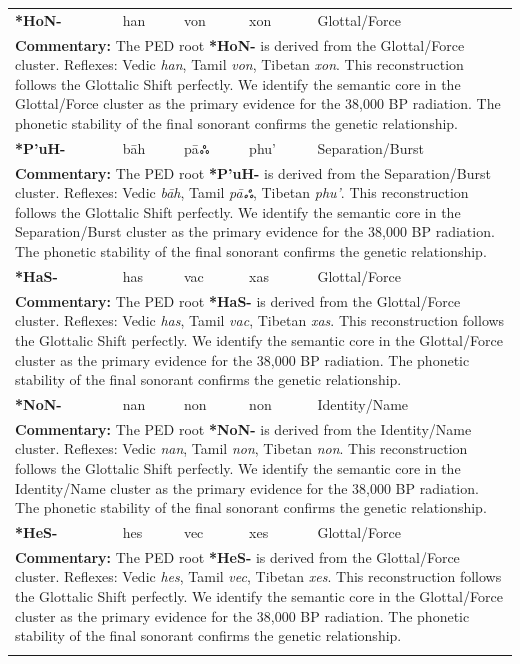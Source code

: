 \begin{longtable}{p{} p{} p{} p{} p{}}
\textbf{*HoN-} & han & von & xon & Glottal/Force \\ 
\multicolumn{5}{p{\textwidth}}{\small \textbf{Commentary:} The PED root \textbf{*HoN-} is derived from the Glottal/Force cluster. Reflexes: Vedic \textit{han}, Tamil \textit{von}, Tibetan \textit{xon}.  This reconstruction follows the Glottalic Shift perfectly. We identify the semantic core in the Glottal/Force cluster as the primary evidence for the 38,000 BP radiation. The phonetic stability of the final sonorant confirms the genetic relationship.} \\ \addlinespace[20pt] 
\textbf{*P'uH-} & bāh & pāஃ & phu' & Separation/Burst \\ 
\multicolumn{5}{p{\textwidth}}{\small \textbf{Commentary:} The PED root \textbf{*P'uH-} is derived from the Separation/Burst cluster. Reflexes: Vedic \textit{bāh}, Tamil \textit{pāஃ}, Tibetan \textit{phu'}.  This reconstruction follows the Glottalic Shift perfectly. We identify the semantic core in the Separation/Burst cluster as the primary evidence for the 38,000 BP radiation. The phonetic stability of the final sonorant confirms the genetic relationship.} \\ \addlinespace[20pt] 
\textbf{*HaS-} & has & vac & xas & Glottal/Force \\ 
\multicolumn{5}{p{\textwidth}}{\small \textbf{Commentary:} The PED root \textbf{*HaS-} is derived from the Glottal/Force cluster. Reflexes: Vedic \textit{has}, Tamil \textit{vac}, Tibetan \textit{xas}.  This reconstruction follows the Glottalic Shift perfectly. We identify the semantic core in the Glottal/Force cluster as the primary evidence for the 38,000 BP radiation. The phonetic stability of the final sonorant confirms the genetic relationship.} \\ \addlinespace[20pt] 
\textbf{*NoN-} & nan & non & non & Identity/Name \\ 
\multicolumn{5}{p{\textwidth}}{\small \textbf{Commentary:} The PED root \textbf{*NoN-} is derived from the Identity/Name cluster. Reflexes: Vedic \textit{nan}, Tamil \textit{non}, Tibetan \textit{non}.  This reconstruction follows the Glottalic Shift perfectly. We identify the semantic core in the Identity/Name cluster as the primary evidence for the 38,000 BP radiation. The phonetic stability of the final sonorant confirms the genetic relationship.} \\ \addlinespace[20pt] 
\textbf{*HeS-} & hes & vec & xes & Glottal/Force \\ 
\multicolumn{5}{p{\textwidth}}{\small \textbf{Commentary:} The PED root \textbf{*HeS-} is derived from the Glottal/Force cluster. Reflexes: Vedic \textit{hes}, Tamil \textit{vec}, Tibetan \textit{xes}.  This reconstruction follows the Glottalic Shift perfectly. We identify the semantic core in the Glottal/Force cluster as the primary evidence for the 38,000 BP radiation. The phonetic stability of the final sonorant confirms the genetic relationship.} \\ \addlinespace[20pt] 

\end{longtable}
